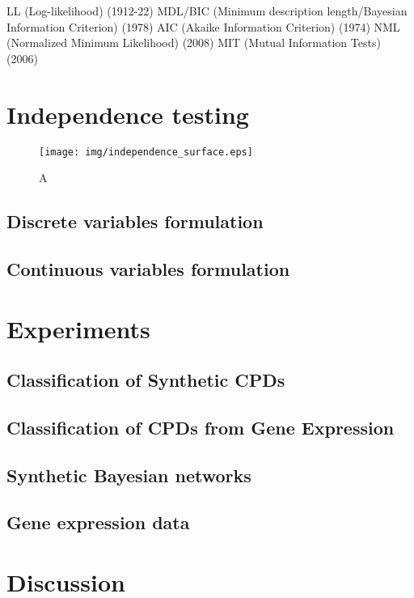\documentclass{article} %
\begin{document}
LL (Log-likelihood) (1912-22)
MDL/BIC (Minimum description length/Bayesian Information Criterion) (1978)
AIC (Akaike Information Criterion) (1974)
NML (Normalized Minimum Likelihood) (2008)
MIT (Mutual Information Tests) (2006)

\cite{margaritis2003learning}

\section{Independence testing}

\begin{figure}[h]
\centering
\texttt{[image: img/independence\_surface.eps]}
\caption{A}
\end{figure}


\subsection{Discrete variables formulation}

\subsection{Continuous variables formulation}

\section{Experiments}

\subsection{Classification of Synthetic CPDs}

\subsection{Classification of CPDs from Gene Expression}

\subsection{Synthetic Bayesian networks}

\subsection{Gene expression data}

\section{Discussion}

\begin{small}

%
%

\end{small}

%
\end{document}

